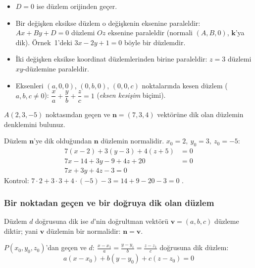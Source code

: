 \begin{bilgi}
\begin{itemize}
  \item $D=0$ ise düzlem orijinden geçer.
  \item Bir değişken eksikse düzlem o değişkenin eksenine paraleldir: $Ax+By+D=0$ düzlemi $Oz$ eksenine paraleldir (normali $(A,B,0)$, $\mathbf k$'ya dik). Örnek~1'deki $3x-2y+1=0$ böyle bir düzlemdir.
  \item İki değişken eksikse koordinat düzlemlerinden birine paraleldir: $z=3$ düzlemi $xy$-düzlemine paraleldir.
  \item Eksenleri $(a,0,0)$, $(0,b,0)$, $(0,0,c)$ noktalarında kesen düzlem ($a,b,c\neq0$): $\dfrac xa+\dfrac yb+\dfrac zc=1$ (\emph{eksen kesişim} biçimi).
\end{itemize}
\end{bilgi}

\begin{soru}
$A(2,3,-5)$ noktasından geçen ve $\mathbf n=(7,3,4)$ vektörüne dik olan düzlemin denklemini bulunuz.
\end{soru}
\begin{cevap}
Düzlem $\mathbf n$'ye dik olduğundan $\mathbf n$ düzlemin normalidir. $x_0=2,\ y_0=3,\ z_0=-5$:
\begin{align*}
7(x-2)+3(y-3)+4(z+5)&=0\\
7x-14+3y-9+4z+20&=0\\
\boxed{7x+3y+4z-3=0}&
\end{align*}
Kontrol: $7\cdot2+3\cdot3+4\cdot(-5)-3=14+9-20-3=0$ \checkmark.
\end{cevap}

\subsubsection{Bir noktadan geçen ve bir doğruya dik olan düzlem}

Düzlem $d$ doğrusuna dik ise $d$'nin doğrultman vektörü $\mathbf v=(a,b,c)$ düzleme diktir; yani $\mathbf v$ düzlemin bir normalidir: $\mathbf n=\mathbf v$.
\begin{teorem}
$P(x_0,y_0,z_0)$'dan geçen ve $d:\ \frac{x-x_1}{a}=\frac{y-y_1}{b}=\frac{z-z_1}{c}$ doğrusuna dik düzlem:
\[ \boxed{\ a(x-x_0)+b(y-y_0)+c(z-z_0)=0\ } \]
\end{teorem}

